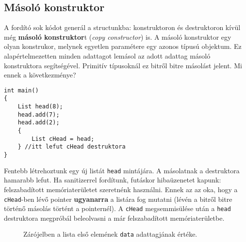 \documentclass[a4paper,11.5pt,table]{article}
\begin{document}
	\subsection{Másoló konstruktor}
	
	A fordító sok kódot generál a structunkba: konstruktoron és destruktoron kívül még \textbf{másoló konstruktor}t (\textit{copy constructor}) is. A másoló konstruktor egy olyan konstrukor, melynek egyetlen paramétere egy azonos típusú objektum. Ez alapértelmezetten minden adattagot lemásol az adott adattag másoló konstruktora segítségével. Primitív típusoknál ez bitről bitre másolást jelent. Mi ennek a következménye?
	\begin{lstlisting}
int main()
{
	List head(8);
	head.add(7);
	head.add(2);
	{
		List cHead = head;
	} //itt lefut cHead destruktora
}
	\end{lstlisting}
	Fentebb létrehoztunk egy új listát \texttt{head} mintájára. A másolatnak a destruktora hamarabb lefut. Ha sanitizerrel fordítunk, futáskor hibaüzenetet kapunk: felszabadított memóriaterületet szeretnénk használni. Ennek az az oka, hogy a \texttt{cHead}-ben lévő pointer \textbf{ugyanarra} a listára fog mutatni (lévén a bitről bitre történő másolás történt a pointernél). A \texttt{cHead} megsemmisülése után a \texttt{head} destruktora megpróbál beleolvasni a már felszabadított memóriaterületbe.
	
	\begin{figure}[!h]
		\centering
		\smallskip
		
		Zárójelben a lista első elemének \texttt{data} adattagjának értéke.
	\end{figure}
	
\end{document}
